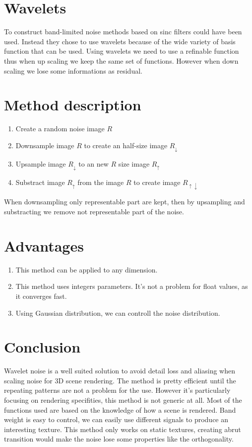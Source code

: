 \documentclass[11pt,a4paper]{article}
\begin{document}
\section{Wavelets}

To construct band-limited noise methods based on sinc filters could have been used. Instead they chose to use wavelets because of the wide variety of basis function that can be used. Using wavelets we need to use a refinable function thus when up scaling we keep the same set of functions. However when down scaling we lose some informations as residual. 

\section{Method description}

\begin{enumerate}
\item Create a random noise image $R$
\item Downsample image $R$ to create an half-size image $R_\downarrow$
\item Upsample image $R_\downarrow$ to an new $R$ size image $R_\uparrow$
\item Substract image $R_\uparrow$ from the image $R$ to create image $R_{\uparrow\downarrow}$
\end{enumerate}
When downsampling only representable part are kept, then by upsampling and substracting we remove not representable part of the noise.

\section{Advantages}

\begin{enumerate}
\item This method can be applied to any dimension.
\item This method uses integers parameters. It's not a problem for float values, as it converges fast.
\item Using Gaussian distribution, we can controll the noise distribution.
\end{enumerate}


\section{Conclusion}

Wavelet noise is a well suited solution to avoid detail loss and aliasing when scaling noise for 3D scene rendering. The method is pretty efficient until the repeating patterns are not a problem for the use. However it's particularly focusing on rendering specifities, this method is not generic at all. Most of the functions used are based on the knowledge of how a scene is rendered. Band weight is easy to control, we can easily use different signals to produce an interesting texture. This method only works on static textures, creating abrut transition would make the noise lose some properties like the orthogonality.
\end{document}
